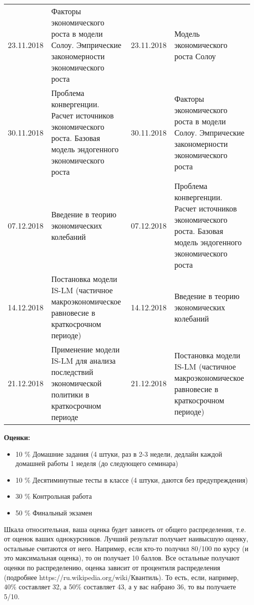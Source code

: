 \documentclass[11pt, a4paper]{article}
\begin{document}
\begin{longtable} {|p{1.6cm}|p{7cm}|p{1.6cm}|p{7cm}|}
23.11.2018&	Факторы экономического роста в модели Солоу. Эмпрические закономерности экономического роста&	23.11.2018&	Модель экономического роста Солоу\\
30.11.2018&	Проблема конвергенции. Расчет источников экономического роста. Базовая модель эндогенного экономического роста&	30.11.2018&	Факторы экономического роста в модели Солоу. Эмпрические закономерности экономического роста \\
07.12.2018&	Введение в теорию экономических колебаний&	07.12.2018&	Проблема конвергенции. Расчет источников экономического роста. Базовая модель эндогенного экономического роста \\
14.12.2018&	Постановка модели IS-LM (частичное макроэкономическое равновесие в краткосрочном периоде)&	14.12.2018&	Введение в теорию экономических колебаний\\
21.12.2018&	Применение модели IS-LM для анализа последствий экономической политики в краткосрочном периоде&	21.12.2018&	Постановка модели IS-LM (частичное макроэкономическое равновесие в краткосрочном периоде)\\
\hline
\end{longtable}


\newpage
\noindent\textbf{Оценки:}  
\begin{itemize}
\item 10 \% Домашние задания (4 штуки, раз в 2-3 недели, дедлайн каждой домашней работы 1 неделя (до следующего семинара)
\item 10 \% Десятиминутные тесты в классе (4 штуки, даются без предупреждения)
\item  30 \% Контрольная работа 
\item 50 \% Финальный экзамен  
\end{itemize}

Шкала относительная, ваша оценка будет зависеть от общего распределения, т.е. от оценок ваших однокурсников. Лучший результат получает наивысшую оценку, остальные считаются от него. Например, если кто-то получил 80/100 по курсу (и это максимальная оценка), то он получает 10 баллов. Все остальные получают оценки по распределению, оценка зависит от процентиля распределения (подробнее https://ru.wikipedia.org/wiki/Квантиль). То есть, если, например, 40\% составляет 32, а 50\% составляет 43, а у вас набрано 36, то вы получаете 5/10.
\end{document}
